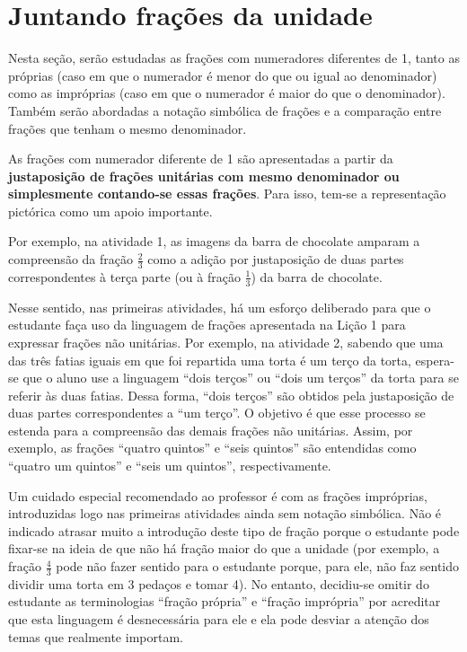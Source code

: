 \documentclass[oneside]{book}
\begin{document}
\chapter{Juntando frações da unidade}
Nesta seção, serão estudadas as frações com numeradores diferentes de 1, tanto as próprias (caso em que o numerador é menor do que ou igual ao denominador) como as impróprias (caso em que o numerador é maior do que o denominador).
Também serão abordadas a notação simbólica de frações e a comparação entre frações que tenham o mesmo denominador. 

As frações com numerador diferente de 1 são apresentadas a partir da {\bf justaposição de frações unitárias com mesmo denominador ou simplesmente contando-se essas frações}. Para isso, tem-se a representação pictórica como um apoio importante. 

Por exemplo, na atividade 1, as imagens da barra de chocolate amparam a compreensão da fração $\frac{2}{3}$ como a adição por justaposição de duas partes correspondentes à terça parte (ou à fração $\frac{1}{3}$) da barra de chocolate.

Nesse sentido, nas primeiras atividades, há um esforço deliberado para que o estudante faça uso da linguagem de frações apresentada na Lição 1 para expressar frações não unitárias. Por exemplo, na atividade 2, sabendo que uma das três fatias iguais em que foi repartida uma torta é um terço da torta, espera-se que o aluno use a linguagem ``dois terços'' ou ``dois um terços'' da torta para se referir às duas fatias. Dessa forma, ``dois terços'' são obtidos pela justaposição de duas partes correspondentes a ``um terço''. O objetivo é que esse processo se estenda para a compreensão das demais frações não unitárias. Assim, por exemplo, as frações ``quatro quintos'' e ``seis quintos'' são entendidas como ``quatro um quintos'' e ``seis um quintos'', respectivamente.

Um cuidado especial recomendado ao professor é com as frações impróprias, introduzidas logo nas primeiras atividades ainda sem notação simbólica. Não é indicado atrasar muito a introdução deste tipo de fração porque o estudante pode fixar-se na ideia de que não há fração maior do que a unidade  (por exemplo, a fração $\frac{4}{3}$ pode não fazer sentido para o estudante porque, para ele, não faz sentido dividir uma torta em 3 pedaços e tomar 4). No entanto, decidiu-se omitir do estudante as terminologias ``fração própria'' e ``fração imprópria'' por acreditar que esta linguagem é desnecessária para ele e ela pode desviar a atenção dos temas que realmente importam.
\end{document}
